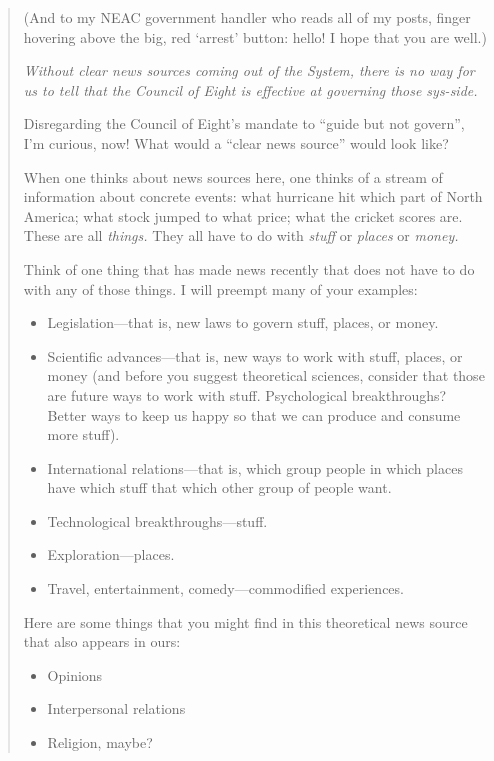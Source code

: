 \begin{quote}
(And to my NEAC government handler who reads all of my posts, finger hovering above the big, red `arrest' button: hello! I hope that you are well.)

\emph{Without clear news sources coming out of the System, there is no way for us to tell that the Council of Eight is effective at governing those sys-side.}

Disregarding the Council of Eight's mandate to ``guide but not govern'', I'm curious, now! What would a ``clear news source'' would look like?

When one thinks about news sources here, one thinks of a stream of information about concrete events: what hurricane hit which part of North America; what stock jumped to what price; what the cricket scores are. These are all \emph{things.} They all have to do with \emph{stuff} or \emph{places} or \emph{money.}

Think of one thing that has made news recently that does not have to do with any of those things. I will preempt many of your examples:

\vspace{-0.25em}

\begin{itemize}
\tightlist
\item
  Legislation---that is, new laws to govern stuff, places, or money.
\item
  Scientific advances---that is, new ways to work with stuff, places, or money (and before you suggest theoretical sciences, consider that those are future ways to work with stuff. Psychological breakthroughs? Better ways to keep us happy so that we can produce and consume more stuff).
\item
  International relations---that is, which group people in which places have which stuff that which other group of people want.
\item
  Technological breakthroughs---stuff.
\item
  Exploration---places.
\item
  Travel, entertainment, comedy---commodified experiences.
\end{itemize}

\vspace{-0.25em}

Here are some things that you might find in this theoretical news source that also appears in ours:

\vspace{-0.25em}

\begin{itemize}
\tightlist
\item
  Opinions
\item
  Interpersonal relations
\item
  Religion, maybe?
\end{itemize}


\end{quote}
